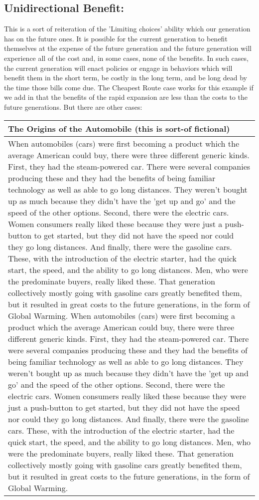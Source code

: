 \subsection{Unidirectional Benefit:}

This is a sort of reiteration of the 'Limiting choices' ability which our generation has on the future ones. It is possible for the current generation to benefit themselves at the expense of the future generation and the future generation will experience all of the cost and, in some cases, none of the benefits. In such cases, the current generation will enact policies or engage in behaviors which will benefit them in the short term, be costly in the long term, and be long dead by the time those bills come due.  The Cheapest Route case works for this example if we add in that the benefits of the rapid expansion are less than the costs to the future generations. But there are other cases:
\begin{tabular}{p{4in}}
The Origins of the Automobile (this is sort-of fictional)\\\hline
When automobiles (cars) were first becoming a product which the average American could buy, there were three different generic kinds. First, they had the steam-powered car. There were several companies producing these and they had the benefits of being familiar technology as well as able to go long distances. They weren't bought up as much because they didn't have the 'get up and go' and the speed of the other options. Second, there were the electric cars. Women consumers really liked these because they were just a push-button to get started, but they did not have the speed nor could they go long distances. And finally, there were the gasoline cars. These, with the introduction of the electric starter, had the quick start, the speed, and the ability to go long distances. Men, who were the predominate buyers, really liked these. That generation collectively mostly going with gasoline cars greatly benefited them,  but it resulted in great costs to the future generations, in the form of Global Warming. When automobiles (cars) were first becoming a product which the average American could buy, there were three different generic kinds. First, they had the steam-powered car. There were several companies producing these and they had the benefits of being familiar technology as well as able to go long distances. They weren't bought up as much because they didn't have the 'get up and go' and the speed of the other options. Second, there were the electric cars. Women consumers really liked these because they were just a push-button to get started, but they did not have the speed nor could they go long distances. And finally, there were the gasoline cars. These, with the introduction of the electric starter, had the quick start, the speed, and the ability to go long distances. Men, who were the predominate buyers, really liked these. That generation collectively mostly going with gasoline cars greatly benefited them,  but it resulted in great costs to the future generations, in the form of Global Warming. \\
\end{tabular}
